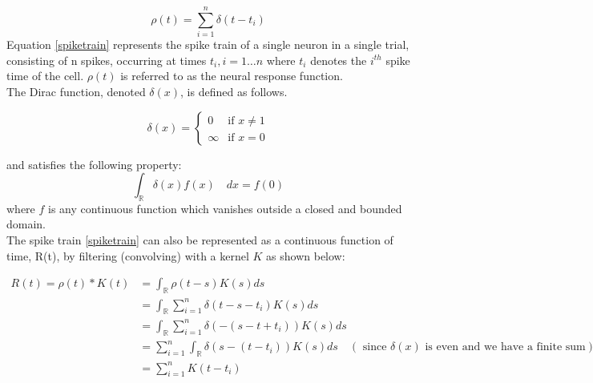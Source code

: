 
\begin{equation}\label{spiketrain}
 \rho(t) = \sum_{i=1}^{n} \delta(t-t_{i})  
\end{equation}
Equation \eqref{spiketrain} represents the spike train of a single neuron in a single trial, consisting of n spikes, occurring at times $t_{i}, i = 1 \ldots n$ where $t_{i}$ denotes the $i^{th}$ spike time of the cell.  
$\rho(t)$ is referred to as the neural response function.\\


The Dirac function, denoted $\delta(x)$, is defined as follows.
\begin{Def}
\[
  \delta(x) =
  \begin{cases}
                                   0 & \text{if $x \neq 1$} \\
                                   \infty & \text{if $x=0$} 
  \end{cases}
\]
\end{Def}
and satisfies the following property:
\begin{equation} \label{DiracDelta}
\displaystyle \int_{\mathbb{R}}  \delta(x)f(x) \quad dx = f(0) 
\end{equation}
where $f$ is any continuous function which vanishes outside a closed 
and bounded domain.\\

The  spike train \eqref{spiketrain} can also be represented as a continuous function of time, R(t), by filtering (convolving) with a kernel $K$ as shown below:

\begin{align*}
\displaystyle
R(t) = \rho(t)*K(t) &= \int_{\mathbb{R}} \rho(t-s)K(s)  ds \\
& = \int_{\mathbb{R}}    \sum_{i=1}^{n} \delta(t - s -t_{i}) K(s)  ds  \\
& =  \int_{\mathbb{R}}    \sum_{i=1}^{n} \delta( -(s - t + t_{i})) K(s)  ds\\
& =  \sum_{i=1}^{n}   \int_{\mathbb{R}} \delta(s - (t - t_{i})) K(s)  ds \quad (\text{ since $\delta(x)$ is even and we have a finite sum})\\
& = \sum_{i=1}^{n} K(t-t_{i}) 
\end{align*}

